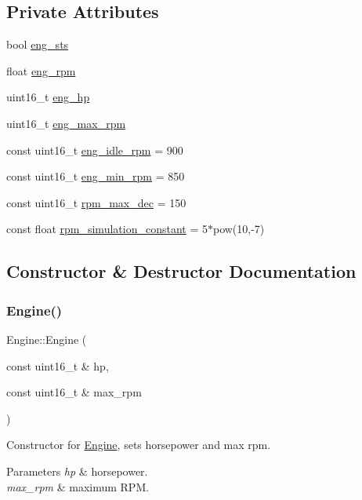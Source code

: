 \subsection*{Private Attributes}
\begin{DoxyCompactItemize}
\item 
bool \hyperlink{classEngine_a2c5cddbb86ed53703f2ed8182d505c82}{eng\+\_\+sts}
\item 
float \hyperlink{classEngine_aa502de3162f10d4e7f086cb08c817372}{eng\+\_\+rpm}
\item 
uint16\+\_\+t \hyperlink{classEngine_a450f51a16e7aa1af382193e8acf6e36a}{eng\+\_\+hp}
\item 
uint16\+\_\+t \hyperlink{classEngine_a2d840eecfbd0cc30d0063daee122b66f}{eng\+\_\+max\+\_\+rpm}
\item 
const uint16\+\_\+t \hyperlink{classEngine_a4a099af57c5bb8df6006aeab0e1f30ae}{eng\+\_\+idle\+\_\+rpm} = 900
\item 
const uint16\+\_\+t \hyperlink{classEngine_a83b157d748ed627fbeb06ae4a7b4514a}{eng\+\_\+min\+\_\+rpm} = 850
\item 
const uint16\+\_\+t \hyperlink{classEngine_ac03e3994b854b6ecbb3bf05dba2942a5}{rpm\+\_\+max\+\_\+dec} = 150
\item 
const float \hyperlink{classEngine_aac9426589cebccaa8cadf7cc7a0ba9be}{rpm\+\_\+simulation\+\_\+constant} = 5$\ast$pow(10,-\/7)
\end{DoxyCompactItemize}


\subsection{Constructor \& Destructor Documentation}
\mbox{\label{classEngine_a756d6abb1d53627a0763f53490a774ef}} 
\subsubsection{\texorpdfstring{Engine()}{Engine()}}
{\footnotesize\ttfamily Engine\+::\+Engine (\begin{DoxyParamCaption}\item[{const uint16\+\_\+t \&}]{hp,  }\item[{const uint16\+\_\+t \&}]{max\+\_\+rpm }\end{DoxyParamCaption})}

Constructor for \hyperlink{classEngine}{Engine}, sets horsepower and max rpm. 
\begin{DoxyParams}{Parameters}
{\em hp} & horsepower. \\
\hline
{\em max\+\_\+rpm} & maximum R\+PM. \\
\hline
\end{DoxyParams}



